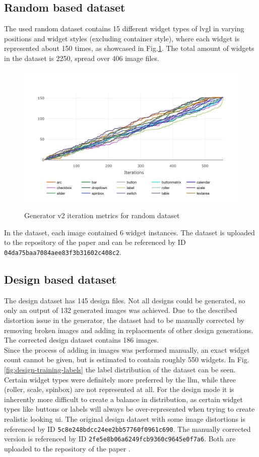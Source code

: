 \documentclass[Bachelor, BIC, english, fhCitStyle, IEEE]{BASE/twbook} %
\def\code#1{\texttt{#1}}
\begin{document}
\subsection{Random based dataset}
The used random dataset contains 15 different widget types of \ac{lvgl} in varying positions and widget styles (excluding container style), where each widget is represented about 150 times, as showcased in Fig.\ref{fig:random-widget-metrics}. The total amount of widgets in the dataset is 2250, spread over 406 image files.\\
\begin{figure}
    \caption{Generator v2 iteration metrics for random dataset}
    \centering
    \includegraphics[width=\textwidth]{random_widget_metrics.png}
    \label{fig:random-widget-metrics}
\end{figure}
In the dataset, each image contained 6 widget instances. The dataset is uploaded to the repository of the paper \autocite{ReleaseFinalPaper} and can be referenced by ID \code{04da75baa7084aee83f3b31602c408c2}.
\subsection{Design based dataset}
The design dataset has 145 design files. Not all designs could be generated, so only an output of 132 generated images was achieved. Due to the described distortion issue in the generator, the dataset had to be manually corrected by removing broken images and adding in replacements of other design generations. The corrected design dataset contains 186 images.\\
Since the process of adding in images was performed manually, an exact widget count cannot be given, but is estimated to contain roughly 550 widgets. In Fig.\ref{fig:design-training-labels} the label distribution of the dataset can be seen.\\
Certain widget types were definitely more preferred by the \ac{llm}, while three (roller, scale, spinbox) are not represented at all. For the design mode it is inherently more difficult to create a balance in distribution, as certain widget types like buttons or labels will always be over-represented when trying to create realistic looking \ac{ui}.
The original design dataset with some image distortions is referenced by ID \code{5c8e248bdcc24ee2bb57760f0961c690}. The manually corrected version is referenced by ID \code{2fe5e8b06a6249fcb9360c9645e0f7a6}. Both are uploaded to the repository of the paper \autocite{ReleaseFinalPaper}.
\end{document}
